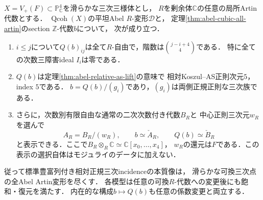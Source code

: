 \begin{theorem}[滑らかな三次点の全Abel変形の平坦二次包絡]
\label{thm:abel-cubic-flat-envelope}
$X=V_+(F)\subset\mathbb P^4_{\mathbb C}$を滑らかな三次三様体とし，
$R$を剰余体$\mathbb C$の任意の局所Artin代数とする．
$\operatorname{Qcoh}(X)$の平坦Abel $R$-変形$\mathcal D$と，
定理\ref{thm:abel-cubic-all-artin}のsection $\mathbb Z$-代数$b$について，
次が成り立つ．
\begin{enumerate}[label=\textup{(\roman*)}]
\item $i\le j$について$Q(b)_{ij}$は全て$R$-自由で，階数は$\binom{j-i+4}{4}$である．
  特に全ての次数三障害ideal $I_i$は零である．
\item $Q(b)$は定理\ref{thm:abel-relative-as-lift}の意味で
  相対Koszul--AS正則次元$5$，index $5$である．
  $b=Q(b)/(g_i)$であり，$(g_i)$は両側正規正則な三次族である．
\item さらに，次数別有限自由な通常の二次次数付き代数$B_R$と
  中心正則三次元$w_R$を選んで
  \[
    A_R=B_R/(w_R),\qquad
    b\simeq\check A_R,\qquad Q(b)\simeq\check B_R
  \]
  と表示できる．ここで$B_R\otimes_R\mathbb C\simeq\mathbb C[x_0,\ldots,x_4]$，
  $w_R$の還元は$F$である．この表示の選択自体はモジュライのデータに加えない．
\end{enumerate}
従って標準豊富列付き相対正規三次incidenceの本質像は，
滑らかな可換三次点の全Abel Artin変形を尽くす．
各模型は任意の可換$R$-代数への変更後にも飽和・復元を満たす．
内在的な構成$b\mapsto Q(b)$も任意の係数変更と両立する．
\end{theorem}
